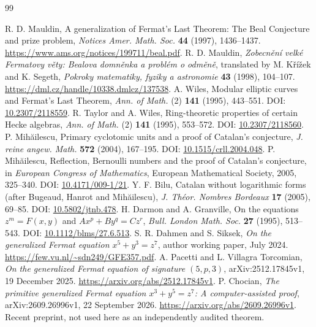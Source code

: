 \clearpage
\begin{thebibliography}{99}\raggedright
{} R. D. Mauldin, A generalization of Fermat's Last Theorem: The Beal Conjecture and prize problem, \emph{Notices Amer. Math. Soc.} \textbf{44} (1997), 1436--1437. \url{https://www.ams.org/notices/199711/beal.pdf}.
 R. D. Mauldin, \emph{Zobecn\v{e}n\'{i} velk\'{e} Fermatovy v\v{e}ty: Bealova domn\v{e}nka a probl\'{e}m o odm\v{e}n\v{e}}, translated by M. K\v{r}\'{i}\v{z}ek and K. Segeth, \emph{Pokroky matematiky, fyziky a astronomie} \textbf{43} (1998), 104--107. \url{https://dml.cz/handle/10338.dmlcz/137538}.
 A. Wiles, Modular elliptic curves and Fermat's Last Theorem, \emph{Ann. of Math.} (2) \textbf{141} (1995), 443--551. DOI: \href{https://doi.org/10.2307/2118559}{10.2307/2118559}.
 R. Taylor and A. Wiles, Ring-theoretic properties of certain Hecke algebras, \emph{Ann. of Math.} (2) \textbf{141} (1995), 553--572. DOI: \href{https://doi.org/10.2307/2118560}{10.2307/2118560}.
 P. Mih\u{a}ilescu, Primary cyclotomic units and a proof of Catalan's conjecture, \emph{J. reine angew. Math.} \textbf{572} (2004), 167--195. DOI: \href{https://doi.org/10.1515/crll.2004.048}{10.1515/crll.2004.048}.
 P. Mih\u{a}ilescu, Reflection, Bernoulli numbers and the proof of Catalan's conjecture, in \emph{European Congress of Mathematics}, European Mathematical Society, 2005, 325--340. DOI: \href{https://doi.org/10.4171/009-1/21}{10.4171/009-1/21}.
 Y. F. Bilu, Catalan without logarithmic forms (after Bugeaud, Hanrot and Mih\u{a}ilescu), \emph{J. Th\'{e}or. Nombres Bordeaux} \textbf{17} (2005), 69--85. DOI: \href{https://doi.org/10.5802/jtnb.478}{10.5802/jtnb.478}.
 H. Darmon and A. Granville, On the equations $z^m=F(x,y)$ and $Ax^p+By^q=Cz^r$, \emph{Bull. London Math. Soc.} \textbf{27} (1995), 513--543. DOI: \href{https://doi.org/10.1112/blms/27.6.513}{10.1112/blms/27.6.513}.
 S. R. Dahmen and S. Siksek, \emph{On the generalized Fermat equation $x^5+y^3=z^7$}, author working paper, July 2024. \url{https://few.vu.nl/~sdn249/GFE357.pdf}.
 A. Pacetti and L. Villagra Torcomian, \emph{On the generalized Fermat equation of signature $(5,p,3)$}, arXiv:2512.17845v1, 19 December 2025. \url{https://arxiv.org/abs/2512.17845v1}.
 P. Chocian, \emph{The primitive generalized Fermat equation $x^3+y^5=z^7$: A computer-assisted proof}, arXiv:2609.26996v1, 22 September 2026. \url{https://arxiv.org/abs/2609.26996v1}. Recent preprint, not used here as an independently audited theorem.

\end{thebibliography}
